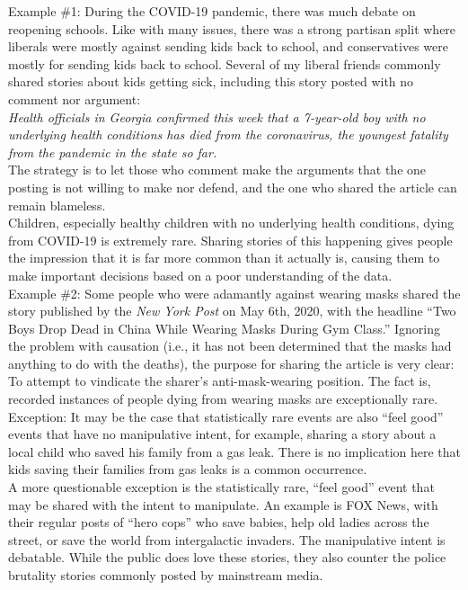 \documentclass[a4paper,12pt,single,pdftex]{scrartcl}
\begin{document}
    
      Example \#1: During the COVID-19 pandemic, there was much debate on reopening schools. Like with many issues, there was a strong partisan split where liberals were mostly against sending kids back to school, and conservatives were mostly for sending kids back to school. Several of my liberal friends commonly shared stories about kids getting sick, including this story posted with no comment nor argument:
    \\

    
      {\em Health officials in Georgia confirmed this week that a 7-year-old boy with no underlying health conditions has died from the coronavirus, the youngest fatality from the pandemic in the state so far.}
    \\

    
      The strategy is to let those who comment make the arguments that the one posting is not willing to make nor defend, and the one who shared the article can remain blameless.
    \\

    
      Children, especially healthy children with no underlying health conditions, dying from COVID-19 is extremely rare. Sharing stories of this happening gives people the impression that it is far more common than it actually is, causing them to make important decisions based on a poor understanding of the data.
    \\

    
      Example \#2: Some people who were adamantly against wearing masks shared the story published by the {\em New York Post} on May 6th, 2020, with the headline “Two Boys Drop Dead in China While Wearing Masks During Gym Class.” Ignoring the problem with causation (i.e., it has not been determined that the masks had anything to do with the deaths), the purpose for sharing the article is very clear: To attempt to vindicate the sharer’s anti-mask-wearing position. The fact is, recorded instances of people dying from wearing masks are exceptionally rare.
    \\

    
      Exception: It may be the case that statistically rare events are also “feel good” events that have no manipulative intent, for example, sharing a story about a local child who saved his family from a gas leak. There is no implication here that kids saving their families from gas leaks is a common occurrence.
    \\

    
      A more questionable exception is the statistically rare, “feel good” event that may be shared with the intent to manipulate. An example is FOX News, with their regular posts of “hero cops” who save babies, help old ladies across the street, or save the world from intergalactic invaders. The manipulative intent is debatable. While the public does love these stories, they also counter the police brutality stories commonly posted by mainstream media. 
    \\
\end{document}
